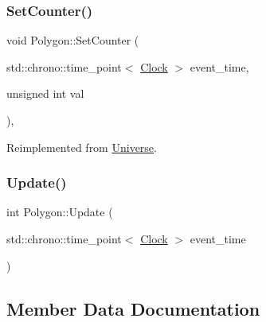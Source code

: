 \mbox{\label{classPolygon_ad12083d8c152a1979b04bead93b6b730}} 
\subsubsection{\texorpdfstring{Set\+Counter()}{SetCounter()}\hspace{0.1cm}{\footnotesize\ttfamily [2/2]}}
{\footnotesize\ttfamily void Polygon\+::\+Set\+Counter (\begin{DoxyParamCaption}\item[{std\+::chrono\+::time\+\_\+point$<$ \mbox{\hyperlink{universe_8h_a0ef8d951d1ca5ab3cfaf7ab4c7a6fd80}{Clock}} $>$}]{event\+\_\+time,  }\item[{unsigned int}]{val }\end{DoxyParamCaption})\hspace{0.3cm}{\ttfamily [inline]}, {\ttfamily [virtual]}}



Reimplemented from \mbox{\hyperlink{classUniverse_aa22202ae740eb1355529afcb13285e91}{Universe}}.

\mbox{\label{classPolygon_ab3fe58d8ffce2e16589958def88aa188}} 
\subsubsection{\texorpdfstring{Update()}{Update()}}
{\footnotesize\ttfamily int Polygon\+::\+Update (\begin{DoxyParamCaption}\item[{std\+::chrono\+::time\+\_\+point$<$ \mbox{\hyperlink{universe_8h_a0ef8d951d1ca5ab3cfaf7ab4c7a6fd80}{Clock}} $>$}]{event\+\_\+time }\end{DoxyParamCaption})}



\subsection{Member Data Documentation}
\mbox{\label{classPolygon_a06161c2266baa0d3ef7afeeeccc0547b}} 
